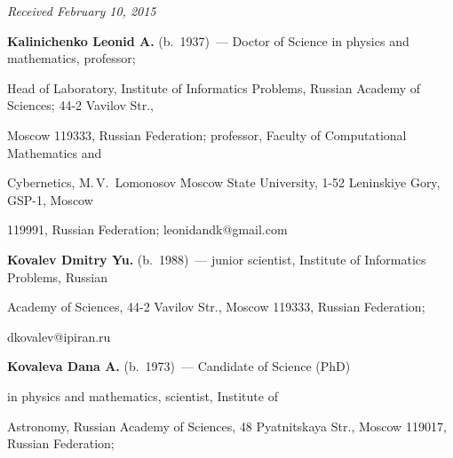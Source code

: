 \vspace*{-3pt}





\hfill{\small\textit{Received February 10, 2015}}





\vspace*{-36pt}





\Contr





\noindent


\textbf{Kalinichenko Leonid A.} (b.\ 1937)~--- Doctor of Science in physics and mathematics, professor;


Head of Laboratory, Institute of Informatics Problems, Russian Academy of Sciences; 44-2 Vavilov Str.,


Moscow 119333, Russian Federation; professor, Faculty of Computational Mathematics and


Cybernetics, M.\,V.~Lomonosov Moscow State University, 1-52 Leninskiye Gory, GSP-1, Moscow


119991, Russian Federation; leonidandk@gmail.com





\vspace*{3pt}





\noindent


\textbf{Kovalev Dmitry Yu.} (b.\ 1988)~--- junior scientist, Institute of Informatics Problems, Russian


Academy of Sciences, 44-2 Vavilov Str., Moscow 119333, Russian Federation;


dkovalev@ipiran.ru








\vspace*{3pt}





\noindent


\textbf{Kovaleva Dana A.} (b.\ 1973)~--- Candidate of Science (PhD)


in physics and mathematics, scientist, Institute of


Astronomy, Russian Academy of Sciences, 48 Pyatnitskaya Str., Moscow 119017, Russian Federation;


